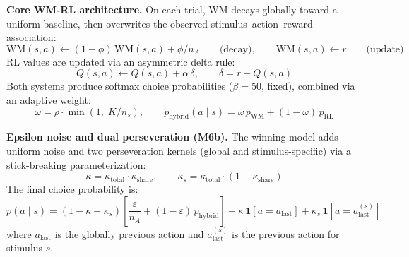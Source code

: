 \documentclass{article}
\begin{document}
\textbf{Core WM-RL architecture.} On each trial, WM decays globally
toward a uniform baseline, then overwrites the observed
stimulus--action--reward association:
\[\text{WM}(s,a) \leftarrow (1 - \phi)\,\text{WM}(s,a) + \phi / n_A
\qquad\text{(decay)},\qquad
\text{WM}(s,a) \leftarrow r
\qquad\text{(update)}\] RL values are updated via an asymmetric delta
rule: \[Q(s,a) \leftarrow Q(s,a) + \alpha\,\delta, \qquad
\delta = r - Q(s,a)\] Both systems produce softmax choice probabilities
(\(\beta = 50\), fixed), combined via an adaptive weight:
\[\omega = \rho \cdot \min\!\left(1,\; K / n_s\right),\qquad
p_{\text{hybrid}}(a \mid s) = \omega\,p_{\text{WM}} + (1-\omega)\,p_{\text{RL}}\]

\textbf{Epsilon noise and dual perseveration (M6b).} The winning model
adds uniform noise and two perseveration kernels (global and
stimulus-specific) via a stick-breaking parameterization:
\[\kappa = \kappa_{\text{total}} \cdot \kappa_{\text{share}}, \qquad
\kappa_s = \kappa_{\text{total}} \cdot (1 - \kappa_{\text{share}})\] The
final choice probability is:
\[p(a \mid s) = (1 - \kappa - \kappa_s)\left[\frac{\varepsilon}{n_A} + (1-\varepsilon)\,p_{\text{hybrid}}\right]
+ \kappa\,\mathbf{1}[a = a_{\text{last}}]
+ \kappa_s\,\mathbf{1}[a = a_{\text{last}}^{(s)}]\] where
\(a_{\text{last}}\) is the globally previous action and
\(a_{\text{last}}^{(s)}\) is the previous action for stimulus \(s\).
\end{document}
